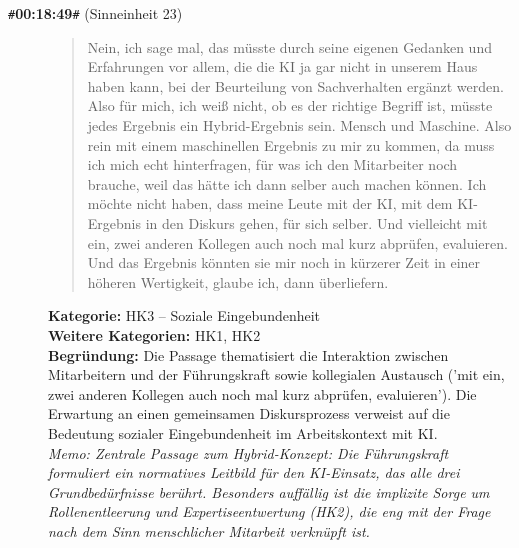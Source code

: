 \begin{description}
  \item[\texttt{\#}\textbf{00:18:49}\texttt{\#} (Sinneinheit 23)]
  \begin{quote}
  Nein, ich sage mal, das müsste durch seine eigenen Gedanken und Erfahrungen vor allem, die die KI ja gar nicht in unserem Haus haben kann, bei der Beurteilung von Sachverhalten ergänzt werden. Also für mich, ich weiß nicht, ob es der richtige Begriff ist, müsste jedes Ergebnis ein Hybrid-Ergebnis sein. Mensch und Maschine. Also rein mit einem maschinellen Ergebnis zu mir zu kommen, da muss ich mich echt hinterfragen, für was ich den Mitarbeiter noch brauche, weil das hätte ich dann selber auch machen können. Ich möchte nicht haben, dass meine Leute mit der KI, mit dem KI-Ergebnis in den Diskurs gehen, für sich selber. Und vielleicht mit ein, zwei anderen Kollegen auch noch mal kurz abprüfen, evaluieren. Und das Ergebnis könnten sie mir noch in kürzerer Zeit in einer höheren Wertigkeit, glaube ich, dann überliefern.
  \end{quote}
  \textbf{Kategorie:} HK3 -- Soziale Eingebundenheit\\
  \textbf{Weitere Kategorien:} HK1, HK2\\
  \textbf{Begr\"undung:} Die Passage thematisiert die Interaktion zwischen Mitarbeitern und der Führungskraft sowie kollegialen Austausch ('mit ein, zwei anderen Kollegen auch noch mal kurz abprüfen, evaluieren'). Die Erwartung an einen gemeinsamen Diskursprozess verweist auf die Bedeutung sozialer Eingebundenheit im Arbeitskontext mit KI.
  \\\textit{Memo: Zentrale Passage zum Hybrid-Konzept: Die Führungskraft formuliert ein normatives Leitbild für den KI-Einsatz, das alle drei Grundbedürfnisse berührt. Besonders auffällig ist die implizite Sorge um Rollenentleerung und Expertiseentwertung (HK2), die eng mit der Frage nach dem Sinn menschlicher Mitarbeit verknüpft ist.}
\end{description}
\medskip

